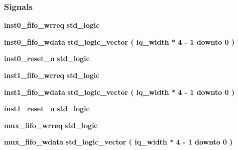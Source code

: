 \subsubsection*{Signals}
 \begin{DoxyCompactItemize}
\item 
{\bf inst0\+\_\+fifo\+\_\+wrreq} {\bfseries \textcolor{comment}{std\+\_\+logic}\textcolor{vhdlchar}{ }} 
\item 
{\bf inst0\+\_\+fifo\+\_\+wdata} {\bfseries \textcolor{comment}{std\+\_\+logic\+\_\+vector}\textcolor{vhdlchar}{ }\textcolor{vhdlchar}{(}\textcolor{vhdlchar}{ }\textcolor{vhdlchar}{ }\textcolor{vhdlchar}{ }\textcolor{vhdlchar}{ }{\bfseries {\bf iq\+\_\+width}} \textcolor{vhdlchar}{$\ast$}\textcolor{vhdlchar}{ } \textcolor{vhdldigit}{4} \textcolor{vhdlchar}{-\/}\textcolor{vhdlchar}{ } \textcolor{vhdldigit}{1} \textcolor{vhdlchar}{ }\textcolor{keywordflow}{downto}\textcolor{vhdlchar}{ }\textcolor{vhdlchar}{ } \textcolor{vhdldigit}{0} \textcolor{vhdlchar}{ }\textcolor{vhdlchar}{)}\textcolor{vhdlchar}{ }} 
\item 
{\bf inst0\+\_\+reset\+\_\+n} {\bfseries \textcolor{comment}{std\+\_\+logic}\textcolor{vhdlchar}{ }} 
\item 
{\bf inst1\+\_\+fifo\+\_\+wrreq} {\bfseries \textcolor{comment}{std\+\_\+logic}\textcolor{vhdlchar}{ }} 
\item 
{\bf inst1\+\_\+fifo\+\_\+wdata} {\bfseries \textcolor{comment}{std\+\_\+logic\+\_\+vector}\textcolor{vhdlchar}{ }\textcolor{vhdlchar}{(}\textcolor{vhdlchar}{ }\textcolor{vhdlchar}{ }\textcolor{vhdlchar}{ }\textcolor{vhdlchar}{ }{\bfseries {\bf iq\+\_\+width}} \textcolor{vhdlchar}{$\ast$}\textcolor{vhdlchar}{ } \textcolor{vhdldigit}{4} \textcolor{vhdlchar}{-\/}\textcolor{vhdlchar}{ } \textcolor{vhdldigit}{1} \textcolor{vhdlchar}{ }\textcolor{keywordflow}{downto}\textcolor{vhdlchar}{ }\textcolor{vhdlchar}{ } \textcolor{vhdldigit}{0} \textcolor{vhdlchar}{ }\textcolor{vhdlchar}{)}\textcolor{vhdlchar}{ }} 
\item 
{\bf inst1\+\_\+reset\+\_\+n} {\bfseries \textcolor{comment}{std\+\_\+logic}\textcolor{vhdlchar}{ }} 
\item 
{\bf mux\+\_\+fifo\+\_\+wrreq} {\bfseries \textcolor{comment}{std\+\_\+logic}\textcolor{vhdlchar}{ }} 
\item 
{\bf mux\+\_\+fifo\+\_\+wdata} {\bfseries \textcolor{comment}{std\+\_\+logic\+\_\+vector}\textcolor{vhdlchar}{ }\textcolor{vhdlchar}{(}\textcolor{vhdlchar}{ }\textcolor{vhdlchar}{ }\textcolor{vhdlchar}{ }\textcolor{vhdlchar}{ }{\bfseries {\bf iq\+\_\+width}} \textcolor{vhdlchar}{$\ast$}\textcolor{vhdlchar}{ } \textcolor{vhdldigit}{4} \textcolor{vhdlchar}{-\/}\textcolor{vhdlchar}{ } \textcolor{vhdldigit}{1} \textcolor{vhdlchar}{ }\textcolor{keywordflow}{downto}\textcolor{vhdlchar}{ }\textcolor{vhdlchar}{ } \textcolor{vhdldigit}{0} \textcolor{vhdlchar}{ }\textcolor{vhdlchar}{)}\textcolor{vhdlchar}{ }} 

\end{DoxyCompactItemize}
